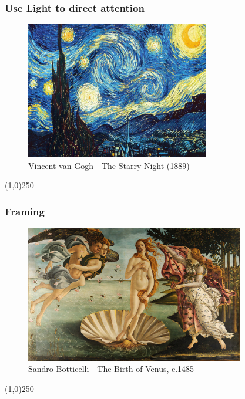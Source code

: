 \begin{frame}
\frametitle{Use Light to direct attention}
\begin{figure}
	\centering
		\includegraphics[height=6cm]{img/candc/starry-night-VanGogh.jpg}
	\caption{Vincent van Gogh - The Starry Night (1889)}
	\label{fig:starrynight}
\end{figure}
\end{frame}
\begin{center}\line(1,0){250}\end{center}




\begin{frame}
\frametitle{Framing}
\begin{figure}
	\centering
	\includegraphics[height=6cm]{img/CandC/1280px-Sandro_Botticelli_-_La_nascita_di_Venere_-_Google_Art_Project_-_edited}
	\caption[Sandro Botticelli - The Birth of Venus, c.1485]{Sandro Botticelli - The Birth of Venus, c.1485}
	\label{fig:sandrobotticelliVenus}
\end{figure}
\end{frame}
\begin{center}\line(1,0){250}\end{center}


